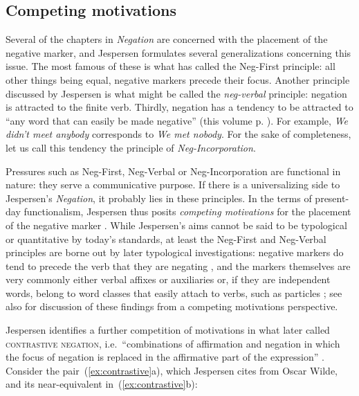 \documentclass[output=chapter]{langscibook}
\begin{document}
\subsection{Competing motivations}

Several of the chapters in \textit{Negation} are concerned with the placement of the negative marker, and Jespersen formulates several generalizations concerning this issue. The most famous of these is what \citet[449]{Horn1989} has called the Neg-First principle: all other things being equal, negative markers precede their focus. Another principle discussed by Jespersen is what might be called the \textit{neg-verbal} principle: negation is attracted to the finite verb. Thirdly, negation has a tendency to be attracted to ``any word that can easily be made negative'' (this volume p. \pageref{p:made-neg}). For example, \textit{We didn’t meet anybody} corresponds to 
\textit{We met nobody}. For the sake of completeness, let us call this tendency the principle of \textit{Neg-Incorporation}.

Pressures such as Neg-First, Neg-Verbal or Neg-Incorporation are functional in nature: they serve a communicative purpose. If there is a universalizing side to Jespersen’s \textit{Negation}, it probably lies in these principles. In the terms of present-day functionalism, Jespersen thus posits \textit{competing motivations} for the placement of the negative marker \citep{DuBois1985}. While Jespersen’s aims cannot be said to be typological or quantitative by today’s standards, at least the Neg-First and Neg-Verbal principles are borne out by later typological investigations: negative markers do tend to precede the verb that they are negating \citep[97--98, 101]{Dryer1992,Dryer2013a}, and the markers themselves are very commonly either verbal affixes or auxiliaries or, if they are independent words, belong to word classes that easily attach to verbs, such as particles \citep{Dahl1979,Dryer2013b}; see also \citet{MiestamoShagalSilvennoinen2022} for discussion of these findings from a competing motivations perspective.

Jespersen identifies a further competition of motivations in what \citet{McCawley1991} later called \textsc{contrastive negation}, i.e.\ ``combinations of affirmation and negation in which the focus of negation is replaced in the affirmative part of the expression'' \citep[10]{Silvennoinen2019}. Consider the pair~(\ref{ex:contrastive}a), which Jespersen cites from Oscar Wilde, and its near-equivalent in~(\ref{ex:contrastive}b):
\end{document}
